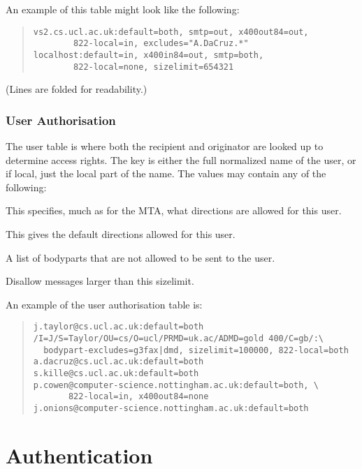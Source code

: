 An example of this table might look like the following:
\begin{quote}\small\begin{verbatim}
vs2.cs.ucl.ac.uk:default=both, smtp=out, x400out84=out,
        822-local=in, excludes="A.DaCruz.*"
localhost:default=in, x400in84=out, smtp=both,
        822-local=none, sizelimit=654321
\end{verbatim}\end{quote}
(Lines are folded for readability.)

\subsubsection{User Authorisation}

The user table is where both the recipient and originator are
looked up to determine access rights. The key is either the full
normalized name of the user, or if local, just the local part of the
name.  The values may contain any of the following:
\begin{describe}
\item[\verb|<channel>=<direction>|:]
This specifies, much as for the MTA, what directions are allowed for
this user.

\item[\verb|default=<direction>|:]
This gives the default directions allowed for this user.

\item[\verb|bodypart-excludes=<bodyparts>|:]
A list of bodyparts that are not allowed to be sent to the user.

\item[\verb|sizelimit=<digits>|:]
Disallow messages larger than this sizelimit.

\end{describe}

An example of the user authorisation table is:
\begin{quote}\small\begin{verbatim}
j.taylor@cs.ucl.ac.uk:default=both
/I=J/S=Taylor/OU=cs/O=ucl/PRMD=uk.ac/ADMD=gold 400/C=gb/:\
  bodypart-excludes=g3fax|dmd, sizelimit=100000, 822-local=both
a.dacruz@cs.ucl.ac.uk:default=both
s.kille@cs.ucl.ac.uk:default=both
p.cowen@computer-science.nottingham.ac.uk:default=both, \
       822-local=in, x400out84=none
j.onions@computer-science.nottingham.ac.uk:default=both
\end{verbatim}\end{quote}

\section{Authentication}\label{sect:authen}

